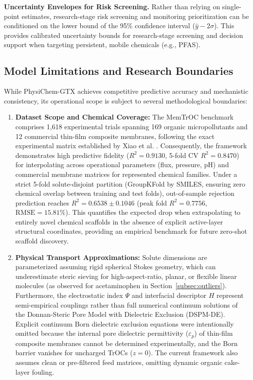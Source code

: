 \documentclass[11pt]{article}
\newcommand{\rsq}{R^{2}}
\begin{document}
\textbf{Uncertainty Envelopes for Risk Screening.} Rather than relying on single-point estimates, research-stage risk screening and monitoring prioritization can be conditioned on the lower bound of the 95\% confidence interval ($\hat{y} - 2\sigma$). This provides calibrated uncertainty bounds for research-stage screening and decision support when targeting persistent, mobile chemicals (e.g., PFAS).

\subsection{Model Limitations and Research Boundaries}
While PhysiChem-GTX achieves competitive predictive accuracy and mechanistic consistency, its operational scope is subject to several methodological boundaries:
\begin{enumerate}[leftmargin=1.3em,itemsep=2pt,topsep=2pt]
\item \textbf{Dataset Scope and Chemical Coverage:} The MemTrOC benchmark comprises 1,618 experimental trials spanning 169 organic micropollutants and 12 commercial thin-film composite membranes, following the exact experimental matrix established by Xiao et al. \cite{xiao2026}. Consequently, the framework demonstrates high predictive fidelity ($\rsq = 0.9130$, 5-fold CV $\rsq = 0.8470$) for interpolating across operational parameters (flux, pressure, pH) and commercial membrane matrices for represented chemical families. Under a strict 5-fold solute-disjoint partition (GroupKFold by SMILES, ensuring zero chemical overlap between training and test folds), out-of-sample rejection prediction reaches $\rsq = 0.6538 \pm 0.1046$ (peak fold $\rsq = 0.7756$, $\mathrm{RMSE} = 15.81\%$). This quantifies the expected drop when extrapolating to entirely novel chemical scaffolds in the absence of explicit active-layer structural coordinates, providing an empirical benchmark for future zero-shot scaffold discovery.
\item \textbf{Physical Transport Approximations:} Solute dimensions are parameterized assuming rigid spherical Stokes geometry, which can underestimate steric sieving for high-aspect-ratio, planar, or flexible linear molecules (as observed for acetaminophen in Section~\ref{subsec:outliers}). Furthermore, the electrostatic index $\Psi$ and interfacial descriptor $H$ represent semi-empirical couplings rather than full numerical continuum solutions of the Donnan-Steric Pore Model with Dielectric Exclusion (DSPM-DE). Explicit continuum Born dielectric exclusion equations were intentionally omitted because the internal pore dielectric permittivity ($\varepsilon_p$) of thin-film composite membranes cannot be determined experimentally, and the Born barrier vanishes for uncharged TrOCs ($z=0$). The current framework also assumes clean or pre-filtered feed matrices, omitting dynamic organic cake-layer fouling.

\end{enumerate}
\end{document}
